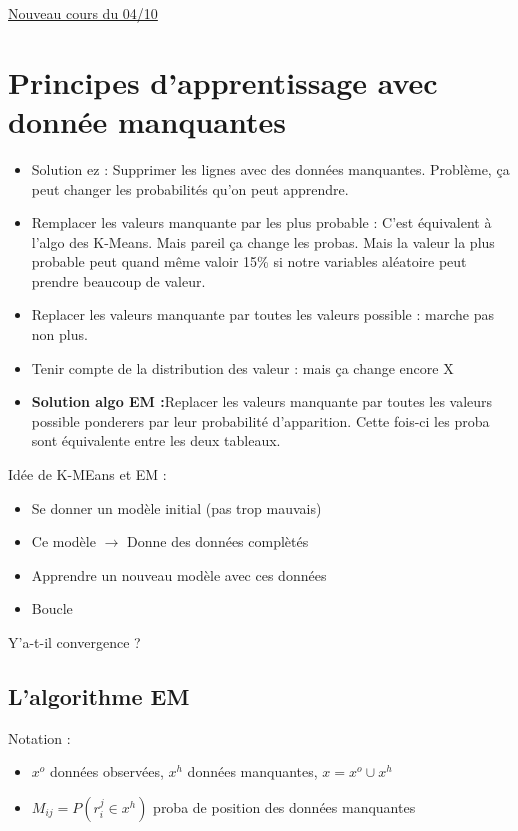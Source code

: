 \documentclass{article}
\theoremstyle{plain}%
\theoremstyle{definition}
\theoremstyle{remark}
\begin{document}
\underline{Nouveau cours du 04/10} \\

\section{Principes d'apprentissage avec donnée manquantes}
\begin{itemize}
    \item Solution ez : Supprimer les lignes avec des données manquantes. Problème, ça peut changer les probabilités qu'on peut apprendre.
    \item Remplacer les valeurs manquante par les plus probable : C'est équivalent à l'algo des K-Means. Mais pareil ça change les probas. Mais la valeur la plus probable peut quand même valoir 15\% si notre variables aléatoire peut prendre beaucoup de valeur. 
    \item Replacer les valeurs manquante par toutes les valeurs possible : marche pas non plus. 
    \item Tenir compte de la distribution des valeur : mais ça change encore X 
    \item \textbf{Solution algo EM :}Replacer les valeurs manquante par toutes les valeurs possible ponderers par leur probabilité d'apparition. Cette fois-ci les proba sont équivalente entre les deux tableaux. 
\end{itemize}
Idée de K-MEans et EM : 
\begin{itemize}
    \item Se donner un modèle initial (pas trop mauvais)
    \item Ce modèle $\rightarrow$ Donne des données complètés
    \item Apprendre un nouveau modèle avec ces données
    \item Boucle
\end{itemize}
Y'a-t-il convergence ? 

\subsection{L'algorithme EM}

Notation : 
\begin{itemize}
    \item $ x^o $  données observées, $ x^h $ données manquantes, $ x = x^o \cup x^h $ 
    \item $M_{ij} = P(r_i^j \in x^h)$ proba de position des données manquantes
\end{itemize}
\end{document}
